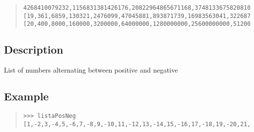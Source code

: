 \begin{haddockdesc}
{\begin{quote}
{\begin{verbatim}
4268410079232,1156831381426176,20822964865671168,374813367582081024,6746640616477458432,-7687677419372609536,9195759040969441280,-497033925936021504,-8946610666848387072],[19,361,6859,130321,2476099,47045881,893871739,16983563041,322687697779,6131066257801,116490258898219,2213314919066161,42052983462257059,799006685782884121,-3265617043834753317,-6706491611731658175,1703867893065355987,-4519998179177339479,6353754964178307979],[20,400,8000,160000,3200000,64000000,1280000000,25600000000,512000000000,10240000000000,204800000000000,4096000000000000,81920000000000000,1638400000000000000,-4125488147419103232,-8722786653543858176,-8435036407491198976,-2680031486438014976,1739602492368355328]]

\end{verbatim}}
\end{quote}}
\end{haddockdesc}
\begin{haddockdesc}
\item[\begin{tabular}{@{}l}
listaPosNeg :: {\char 91}Int{\char 93}
\end{tabular}]
{\haddockbegindoc
\section*{Description}
List of numbers alternating between positive and negative\par
\subsection*{Example}
\begin{quote}
{\haddockverb\begin{verbatim}
>>> listaPosNeg
[1,-2,3,-4,5,-6,7,-8,9,-10,11,-12,13,-14,15,-16,17,-18,19,-20,21,-22,23,-24,25,-26,27,-28,29,-30,31,-32,33,-34,35,-36,37,-38,39,-40,41,-42,43,-44,45,-46,47,-48,49,-50]

\end{verbatim}}
\end{quote}}
\end{haddockdesc}
